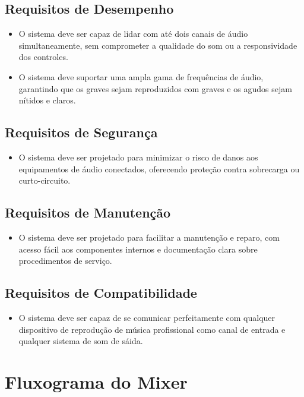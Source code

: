 \subsection{Requisitos de Desempenho}
\begin{itemize}
    \item O sistema deve ser capaz de lidar com até dois canais de áudio simultaneamente, sem comprometer a qualidade do som ou a responsividade dos controles.
    \item O sistema deve suportar uma ampla gama de frequências de áudio, garantindo que os graves sejam reproduzidos com graves e os agudos sejam nítidos e claros.
\end{itemize}

\subsection{Requisitos de Segurança}
\begin{itemize}
    \item O sistema deve ser projetado para minimizar o risco de danos aos equipamentos de áudio conectados, oferecendo proteção contra sobrecarga ou curto-circuito.
\end{itemize}

\subsection{Requisitos de Manutenção}
\begin{itemize}
    \item O sistema deve ser projetado para facilitar a manutenção e reparo, com acesso fácil aos componentes internos e documentação clara sobre procedimentos de serviço.
\end{itemize}

\subsection{Requisitos de Compatibilidade}
\begin{itemize}
    \item O sistema deve ser capaz de se comunicar perfeitamente com qualquer dispositivo de reprodução de música profissional como canal de entrada e qualquer sistema de som de sáida. 
\end{itemize}

\newpage
\section{Fluxograma do Mixer}

